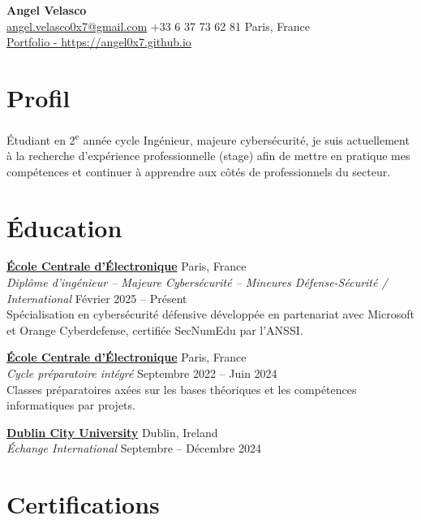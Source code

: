 \documentclass[a4paper,10pt]{article}
\newcommand{\linkedtitle}[2]{\href{#1}{\textbf{\color{myblue}#2}}}
\begin{document}
\begin{center}
    {\LARGE \textbf{Angel Velasco}}\\[3pt]
    \small
    \href{mailto:angel.velasco0x7@gmail.com}{angel.velasco0x7@gmail.com} \quad
    +33 6 37 73 62 81 \quad
    Paris, France \\
    {\Large \href{https://angel0x7.github.io}{Portfolio - https://angel0x7.github.io}} 
\end{center}



\section*{Profil}

Étudiant en 2\textsuperscript{e} année cycle Ingénieur, majeure cybersécurité, je suis actuellement à la recherche d'expérience professionnelle (stage) afin de mettre en pratique mes compétences et continuer à apprendre aux côtés de professionnels du secteur. 

\section*{Éducation}

\noindent
\linkedtitle{https://www.ece.fr/en/program/engineering-cycle-bac4-information-systems-and-cybersecurity-major/}{École Centrale d'Électronique} \hfill Paris, France \\
\emph{Diplôme d'ingénieur – Majeure Cybersécurité – Mineures Défense-Sécurité / International} \hfill Février 2025 -- Présent \\
Spécialisation en cybersécurité défensive développée en partenariat avec Microsoft et Orange Cyberdefense, certifiée SecNumEdu par l’ANSSI. 


\noindent
\linkedtitle{https://www.ece.fr/}{École Centrale d'Électronique} \hfill Paris, France \\
\emph{Cycle préparatoire intégré} \hfill Septembre 2022 -- Juin 2024 \\
Classes préparatoires axées sur les bases théoriques et les compétences informatiques par projets. 


\noindent
\linkedtitle{https://www.dcu.ie/}{Dublin City University} \hfill Dublin, Ireland \\
\emph{Échange International} \hfill Septembre -- Décembre 2024 

\section*{Certifications}
\end{document}
